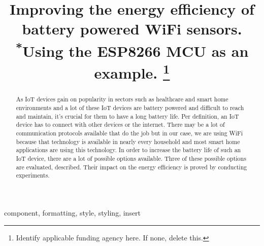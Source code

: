 \documentclass[conference]{IEEEtran}
\begin{document}
\title{Improving the energy efficiency of battery powered WiFi sensors.\\
{\footnotesize \textsuperscript{*}Using the ESP8266 MCU as an example.}
\thanks{Identify applicable funding agency here. If none, delete this.}
}

\author{
\and
{}
\and
{}
}

\maketitle

\begin{abstract}
As IoT devices gain on popularity in sectors such as healthcare and smart home environments and a lot of these IoT devices are battery powered and difficult to reach and maintain, it's crucial for them to have a long battery life.
Per definition, an IoT device has to connect with other devices or the internet. 
There may be a lot of communication protocols available that do the job but in our case, we are using WiFi because that technology is available in nearly every household and most smart home applications are using this technology.
In order to increase the battery life of such an IoT device, there are a lot of possible options available.
Three of these possible options are evaluated, described. Their impact on the energy efficiency is proved by conducting experiments.


\end{abstract}

\begin{IEEEkeywords}
component, formatting, style, styling, insert
\end{IEEEkeywords}
\end{document}
